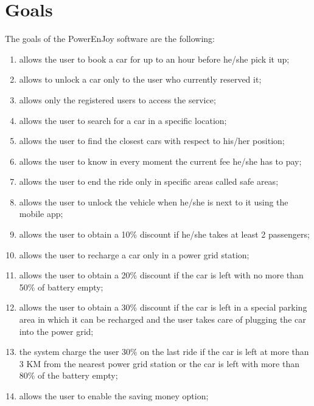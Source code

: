 \section{Goals}
The goals of the PowerEnJoy software are the following:
\begin{enumerate}
	\item allows the user to book a car for up to an hour before he/she pick it up;
	\item allows to unlock a car only to the user who currently reserved it;
	\item allows only the registered users to access the service;
	\item allows the user to search for a car in a specific location; 
	\item allows the user to find the closest cars with respect to his/her position; 
	\item allows the user to know in every moment the current fee he/she has to pay;
	\item allows the user to end the ride only in specific areas called safe areas;
	\item allows the user to unlock the vehicle when he/she is next to it using the mobile app;
	\item allows the user to obtain a 10\% discount if he/she takes at least 2 passengers;
	\item allows the user to recharge a car only in a power grid station;
	\item allows the user to obtain a 20\% discount if the car is left with no more than 50\% of battery empty;
	\item allows the user to obtain a 30\% discount if the car is left in a special parking area in which it can be recharged and the user takes care of plugging the car into the power grid;
	\item the system charge the user 30\% on the last ride if the car is left at more than 3 KM from the nearest power grid station or the car is left with more than 80\% of the battery empty;
	\item allows the user to enable the saving money option;
	
	
\end{enumerate}